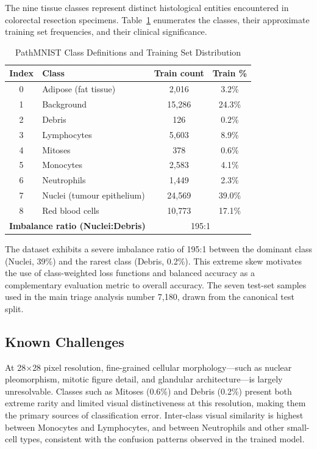 The nine tissue classes represent distinct histological entities encountered in colorectal resection specimens. Table~\ref{tab:pathmnist_classes} enumerates the classes, their approximate training set frequencies, and their clinical significance.

\begin{table}[h]
\footnotesize
\centering
\caption{PathMNIST Class Definitions and Training Set Distribution}
\label{tab:pathmnist_classes}
\begin{tabular}{clcc}
\toprule
\textbf{Index} & \textbf{Class} & \textbf{Train count} & \textbf{Train \%} \\
\midrule
0 & Adipose (fat tissue)    & 2,016  & 3.2\%  \\
1 & Background              & 15,286 & 24.3\% \\
2 & Debris                  & 126    & 0.2\%  \\
3 & Lymphocytes             & 5,603  & 8.9\%  \\
4 & Mitoses                 & 378    & 0.6\%  \\
5 & Monocytes               & 2,583  & 4.1\%  \\
6 & Neutrophils             & 1,449  & 2.3\%  \\
7 & Nuclei (tumour epithelium) & 24,569 & 39.0\% \\
8 & Red blood cells         & 10,773 & 17.1\% \\
\midrule
\multicolumn{2}{l}{\textbf{Imbalance ratio (Nuclei:Debris)}} & \multicolumn{2}{c}{195:1} \\
\bottomrule
\end{tabular}
\end{table}

The dataset exhibits a severe imbalance ratio of 195:1 between the dominant class (Nuclei, 39\%) and the rarest class (Debris, 0.2\%). This extreme skew motivates the use of class-weighted loss functions and balanced accuracy as a complementary evaluation metric to overall accuracy. The seven test-set samples used in the main triage analysis number 7,180, drawn from the canonical test split.

\subsection{Known Challenges}

At 28$\times$28 pixel resolution, fine-grained cellular morphology—such as nuclear pleomorphism, mitotic figure detail, and glandular architecture—is largely unresolvable. Classes such as Mitoses (0.6\%) and Debris (0.2\%) present both extreme rarity and limited visual distinctiveness at this resolution, making them the primary sources of classification error. Inter-class visual similarity is highest between Monocytes and Lymphocytes, and between Neutrophils and other small-cell types, consistent with the confusion patterns observed in the trained model.

